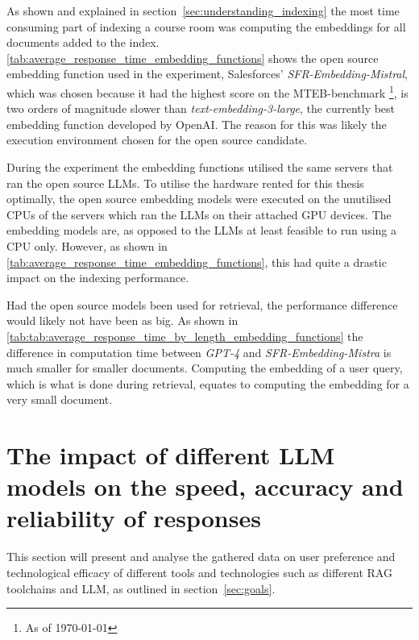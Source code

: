 As shown and explained in section~\ref{sec:understanding_indexing} the most time consuming part of indexing a course room was computing the embeddings for all documents added to the index. \autoref{tab:average_response_time_embedding_functions} shows the open source embedding function used in the experiment, Salesforces’ \textit{SFR-Embedding-Mistral}\cite{meng_sfr-embedding-mistral_2024}, which was chosen because it had the highest score on the \gls{MTEB}-benchmark \footnote{As of \today}, is two orders of magnitude slower than \textit{text-embedding-3-large}, the currently best embedding function developed by OpenAI. The reason for this was likely the execution environment chosen for the open source candidate.





During the experiment the embedding functions utilised the same servers that ran the open source \gls{LLM}s. To utilise the hardware rented for this thesis optimally, the open source embedding models were executed on the unutilised CPUs of the servers which ran the \gls{LLM}s on their attached GPU devices. The embedding models are, as opposed to the \gls{LLM}s at least feasible to run using a CPU only. However, as shown in \autoref{tab:average_response_time_embedding_functions}, this had quite a drastic impact on the indexing performance.


Had the open source models been used for retrieval, the performance difference would likely not have been as big. As shown in \autoref{tab:tab:average_response_time_by_length_embedding_functions} the difference in computation time between \textit{GPT-4} and \textit{SFR-Embedding-Mistra} is much smaller for smaller documents. Computing the embedding of a user query, which is what is done during retrieval, equates to computing the embedding for a very small document.







\section{The impact of different LLM models on the speed, accuracy and reliability of responses}
\label{sec:impact_of_llm_on_user_preferences}


This section will present and analyse the gathered data on user preference and technological efficacy of different tools and technologies such as different \gls{RAG} toolchains and \gls{LLM}, as outlined in section~\ref{sec:goals}.



